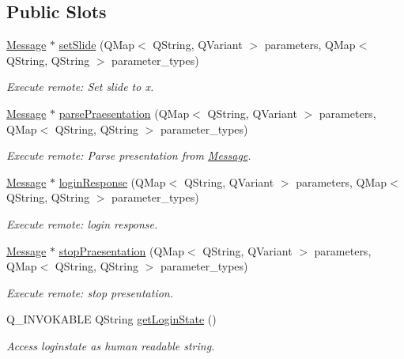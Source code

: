 \subsection*{Public Slots}
\begin{DoxyCompactItemize}
\item 
\hyperlink{class_message}{Message} $\ast$ \hyperlink{class_client_a63f0ef0092e5d2993b6e1bb42fbe1f9b}{set\+Slide} (Q\+Map$<$ Q\+String, Q\+Variant $>$ parameters, Q\+Map$<$ Q\+String, Q\+String $>$ parameter\+\_\+types)
\begin{DoxyCompactList}\small\item\em Execute remote\+: Set slide to x. \end{DoxyCompactList}\item 
\hyperlink{class_message}{Message} $\ast$ \hyperlink{class_client_a9dfa8414217d2930458d1e003c39d5d4}{parse\+Praesentation} (Q\+Map$<$ Q\+String, Q\+Variant $>$ parameters, Q\+Map$<$ Q\+String, Q\+String $>$ parameter\+\_\+types)
\begin{DoxyCompactList}\small\item\em Execute remote\+: Parse presentation from \hyperlink{class_message}{Message}. \end{DoxyCompactList}\item 
\hyperlink{class_message}{Message} $\ast$ \hyperlink{class_client_a5f974cb34a288aea6bf6fe6c176767b5}{login\+Response} (Q\+Map$<$ Q\+String, Q\+Variant $>$ parameters, Q\+Map$<$ Q\+String, Q\+String $>$ parameter\+\_\+types)
\begin{DoxyCompactList}\small\item\em Execute remote\+: login response. \end{DoxyCompactList}\item 
\hyperlink{class_message}{Message} $\ast$ \hyperlink{class_client_a2cea3c8843c7eb320ccce4c705b5ff33}{stop\+Praesentation} (Q\+Map$<$ Q\+String, Q\+Variant $>$ parameters, Q\+Map$<$ Q\+String, Q\+String $>$ parameter\+\_\+types)
\begin{DoxyCompactList}\small\item\em Execute remote\+: stop presentation. \end{DoxyCompactList}\item 
Q\+\_\+\+I\+N\+V\+O\+K\+A\+B\+L\+E Q\+String \hyperlink{class_client_a6d04fe04f23bf5d41522858556108c4f}{get\+Login\+State} ()
\begin{DoxyCompactList}\small\item\em Access loginstate as human readable string. \end{DoxyCompactList}\item 

\end{DoxyCompactItemize}
